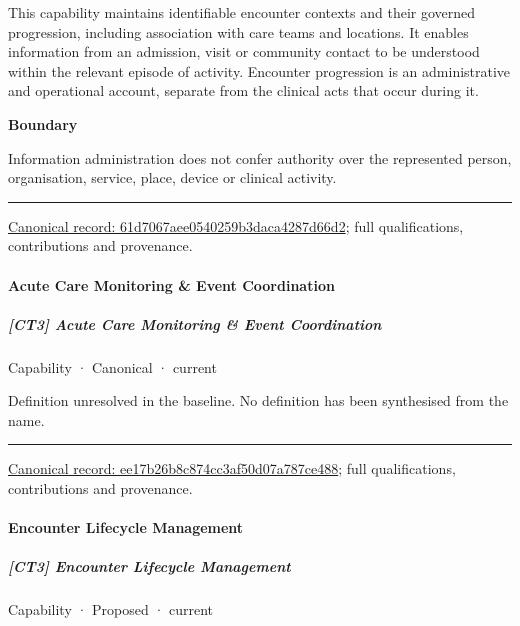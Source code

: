 This capability maintains identifiable encounter contexts and their governed progression, including association with care teams and locations. It enables information from an admission, visit or community contact to be understood within the relevant episode of activity. Encounter progression is an administrative and operational account, separate from the clinical acts that occur during it.



\textbf{Boundary}



Information administration does not confer authority over the represented person, organisation, service, place, device or clinical activity.



\medskip\hrule\medskip

{\footnotesize \href{../../../../continuum/strategy/capability/61d7067aee0540259b3daca4287d66d2.md}{Canonical record: 61d7067aee0540259b3daca4287d66d2}; full qualifications, contributions and provenance.}\par
\paragraph{Acute Care Monitoring \& Event Coordination}

\subparagraph{[CT3] Acute Care Monitoring \& Event Coordination}

\label{element:ee17b26b8c874cc3af50d07a787ce488}
{\small Capability · Canonical · current}\par

Definition unresolved in the baseline. No definition has been synthesised from the name.



\medskip\hrule\medskip

{\footnotesize \href{../../../../continuum/strategy/capability/ee17b26b8c874cc3af50d07a787ce488.md}{Canonical record: ee17b26b8c874cc3af50d07a787ce488}; full qualifications, contributions and provenance.}\par
\paragraph{Encounter Lifecycle Management}

\subparagraph{[CT3] Encounter Lifecycle Management}

\label{element:2ebf1bb20ab34755b41567c156cc5928}
{\small Capability · Proposed · current}\par

